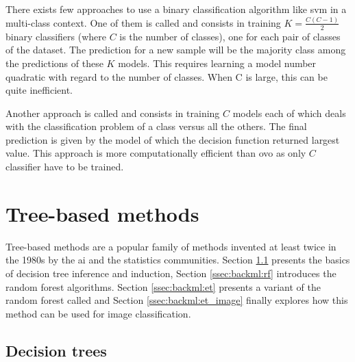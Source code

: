 There exists few approaches to use a binary classification algorithm like
\acrshort{svm} in a multi-class context. One of them is called 
and consists in training $K=\frac{C(C-1)}{2}$ binary classifiers (where $C$ is
the number of classes), one for each pair of classes of the dataset. The prediction
for a new sample will be the majority class among the predictions of these $K$
models. This requires learning a model number quadratic with regard to the number
of classes. When C is large, this can be quite inefficient.

Another approach is called  and consists in training $C$ models
each of which deals with the classification problem of a class versus all the
others. The final prediction is given by the model of which the decision function
returned largest value. This approach is more computationally efficient than
\acrshort{ovo} as only $C$ classifier have to be trained.

\section{Tree-based methods}
\label{sec:backml:treebased}

Tree-based methods are a popular family of methods invented at least twice in the
1980s by the \acrshort{ai} \parencite{quinlan1986induction} and the statistics
\parencite{breiman2017classification} communities. Section \ref{ssec:backml:dt}
presents the basics of decision tree inference and induction, Section \ref{ssec:backml:rf}
introduces the random forest algorithms. Section \ref{ssec:backml:et} presents a
variant of the random forest called  and Section \ref{ssec:backml:et_image}
finally explores how this method can be used for image classification.

\subsection{Decision trees}
\label{ssec:backml:dt}

